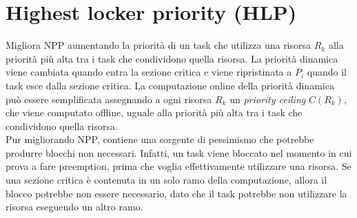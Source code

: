\documentclass[12pt,openany,onesided]{book}
\begin{document}
\section{Highest locker priority (HLP)}
Migliora NPP aumentando la priorità di un task che utilizza una risorsa $R_k$ alla priorità più alta tra i task che condividono quella risorsa.
La priorità dinamica viene cambiata quando entra la sezione critica e viene ripristinata a $P_i$ quando il task esce dalla sezione critica.
La computazione online della priorità dinamica può essere semplificata assegnando a ogni risorsa $R_k$ un \textit{priority ceiling} $C(R_k)$, che viene computato offline, uguale alla priorità più alta tra i task che condividono quella risorsa.
\\
Pur migliorando NPP, contiene una sorgente di pessimismo che potrebbe produrre blocchi non necessari. Infatti, un task viene bloccato nel momento in cui prova a fare preemption, prima che 
voglia effettivamente utilizzare una risorsa. Se una sezione critica è contenuta in un solo ramo della computazione, allora il blocco potrebbe non essere necessario, dato che il task potrebbe non utilizzare la risorsa eseguendo un altro ramo.
\end{document}
